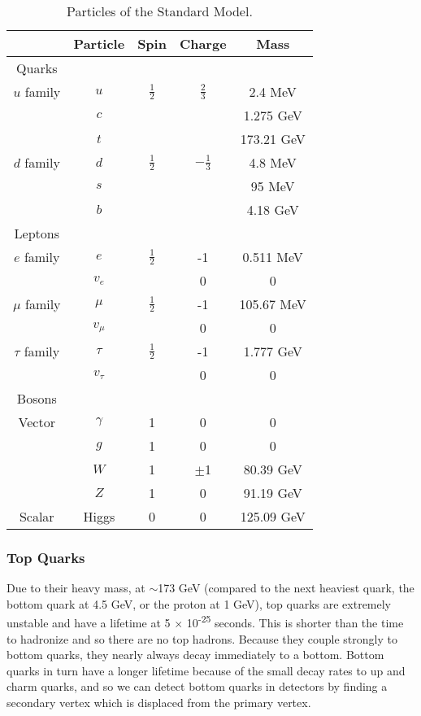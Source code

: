 		
\begin{table}[!htb]
	\centering
	\begin{tabular}{c||c|c|c|c|}
		\hline 
			&	Particle	&	Spin		&	Charge	&	Mass \\
		\hline \hline
		Quarks	&	&	&	&	\\
		\hline
		$u$ family	&	$u$	&	$\frac{1}{2}$	&	$\frac{2}{3}$	&	2.4 MeV \\
				&	$c$	&		&		&	1.275 GeV \\
				&	$t$	&		&		&	173.21 GeV \\

		$d$ family	&	$d$	&	$\frac{1}{2}$	&	$-\frac{1}{3}$	&	4.8 MeV \\
				&	$s$	&		&		&	95 MeV \\
				&	$b$	&		&		&	4.18 GeV \\
		\hline		
		Leptons 	&	&	&	&	\\
		\hline
		$e$ family	&	$e$	&	$\frac{1}{2}$	&	-1	&	0.511 MeV \\
				&	$v_{e}$	&		&	0	&	0 \\
		$\mu$ family	&	$\mu$	&	$\frac{1}{2}$	&	-1	&	105.67 MeV \\
				&	$v_{\mu}$	&		&	0	&	0 \\	
		$\tau$ family	&	$\tau$	&	$\frac{1}{2}$	&	-1	&	1.777 GeV \\
				&	$v_{\tau}$	&		&	0	&	0 \\	
		\hline
		Bosons 	&	&	&	&	\\
		\hline
		Vector 	&	$\gamma$	&	1	&	0	&	0 \\
				&	$g$			&	1	&	0	&	0 \\
				&	$W$		&	1	&	$\pm$1	&	80.39 GeV \\
				&	$Z$		&	1	&	0		&	91.19 GeV \\
		Scalar	&	Higgs	&	0	&	0		&	125.09 GeV \\
		\hline \hline			
	\end{tabular}
	\caption{Particles of the Standard Model.}
	\label{tab:SMparticles}
\end{table}		
		
		

	
	\subsubsection{Top Quarks}
	
Due to their heavy mass, at $\sim$173 GeV (compared to the next heaviest quark, the bottom quark at 4.5 GeV, or the proton at 1 GeV), top quarks are extremely unstable and have a lifetime at 5 $\times$ 10\textsuperscript{-25} seconds. This is shorter than the time to hadronize and so there are no top hadrons.  Because they couple strongly to bottom quarks, they nearly always decay immediately to a bottom.  Bottom quarks in turn have a longer lifetime because of the small decay rates to up and charm quarks, and so we can detect bottom quarks in detectors by finding a secondary vertex which is displaced from the primary vertex.  \\

